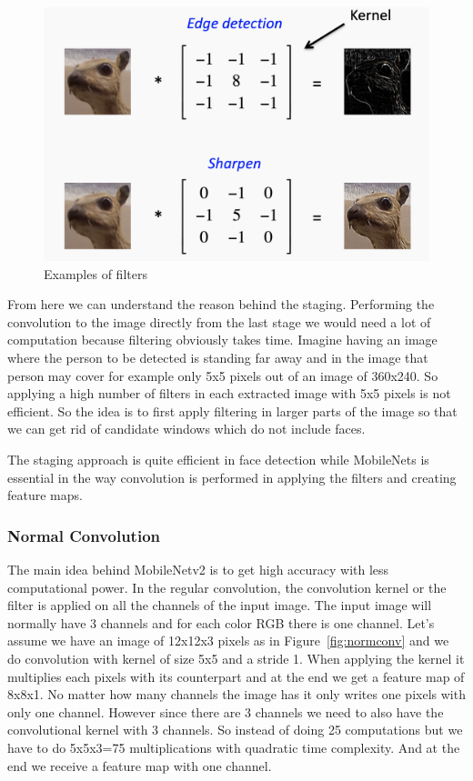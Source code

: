 \begin{figure}[!htb]
    \centering
    \includegraphics[width=1\textwidth]{figures/filters.png}
    \caption{Examples of filters}
    \label{fig:filter}
\end{figure}
From here we can understand the reason behind the staging. Performing the convolution to the image directly from the last stage we would need a lot of computation because filtering obviously takes time. Imagine having an image where the person to be detected is standing far away and in the image that person may cover for example only 5x5 pixels out of an image of 360x240. So applying a high number of filters in each extracted image with 5x5 pixels is not efficient. So the idea is to first apply filtering in larger parts of the image so that we can get rid of candidate windows which do not include faces.

The staging approach is quite efficient in face detection while MobileNets is essential in the way convolution is performed in applying the filters and creating feature maps. 



\subsubsection{Normal Convolution}

The main idea behind MobileNetv2 is to get high accuracy with less computational power. In the regular convolution, the convolution kernel or the filter is applied on all the channels of the input image. The input image will normally have 3 channels and for each color RGB there is one channel. Let's assume we have an image of 12x12x3 pixels as in Figure~\ref{fig:normconv} and we do convolution with kernel of size 5x5 and a stride 1. When applying the kernel it multiplies each pixels with its counterpart and at the end we get a feature map of 8x8x1. No matter how many channels the image has it only writes one pixels with only one channel.
However since there are 3 channels we need to also have the convolutional kernel with 3 channels. So instead of doing 25 computations but we have to do 5x5x3=75 multiplications with quadratic time complexity. And at the end we receive a feature map with one channel. 

